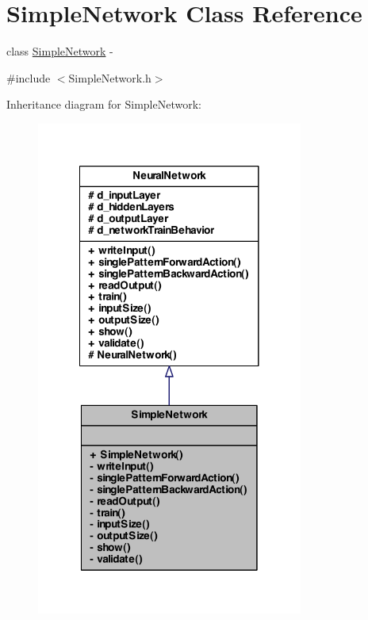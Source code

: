 \hypertarget{class_simple_network}{
\section{SimpleNetwork Class Reference}
\label{class_simple_network}
}


class \hyperlink{class_simple_network}{SimpleNetwork} -\/  




{\ttfamily \#include $<$SimpleNetwork.h$>$}



Inheritance diagram for SimpleNetwork:\nopagebreak
\begin{figure}[H]
\begin{center}
\leavevmode
\includegraphics[width=248pt]{class_simple_network__inherit__graph}
\end{center}
\end{figure}


